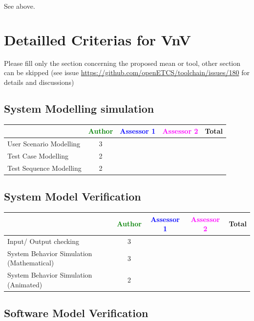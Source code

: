 \begin{author_comment}
	See above.
\end{author_comment}

\section{Detailled Criterias for VnV}

Please  fill only the section concerning the proposed mean or tool, other section can be skipped (see issue \url{https://github.com/openETCS/toolchain/issues/180} for details and discussions)



\subsection{System Modelling simulation}	

\begin{tabular}{|l | c | c | c | c|}
\hline
& \textcolor{green}{Author} & \textcolor{blue}{Assessor 1} & \textcolor{magenta}{Assessor 2} & Total \\
\hline 
User Scenario Modelling & 3 & & &  \\
\hline
Test Case Modelling & 2 & & &  \\
\hline
Test Sequence Modelling & 2 & & &  \\
\hline
\end{tabular}
	
\subsection{System Model Verification}	


\begin{tabular}{|l | c | c | c | c|}
\hline
& \textcolor{green}{Author} & \textcolor{blue}{Assessor 1} & \textcolor{magenta}{Assessor 2} & Total \\
\hline 
Input/ Output checking & 3 & & &  \\
\hline
System Behavior Simulation (Mathematical) & 3 & & &  \\
\hline
System Behavior Simulation (Animated) & 2 & & &  \\
\hline
\end{tabular}


\subsection{Software Model Verification	}


